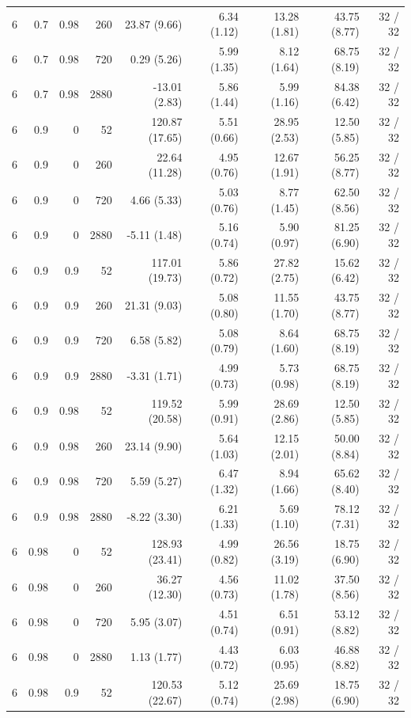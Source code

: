 \begin{longtable}{rrrrrrrrr}
6 & 0.7 & 0.98 & 260 & 23.87 (9.66) & 6.34 (1.12) & 13.28 (1.81) & 43.75 (8.77) & 32 / 32\\
6 & 0.7 & 0.98 & 720 & 0.29 (5.26) & 5.99 (1.35) & 8.12 (1.64) & 68.75 (8.19) & 32 / 32\\
6 & 0.7 & 0.98 & 2880 & -13.01 (2.83) & 5.86 (1.44) & 5.99 (1.16) & 84.38 (6.42) & 32 / 32\\
6 & 0.9 & 0 & 52 & 120.87 (17.65) & 5.51 (0.66) & 28.95 (2.53) & 12.50 (5.85) & 32 / 32\\
6 & 0.9 & 0 & 260 & 22.64 (11.28) & 4.95 (0.76) & 12.67 (1.91) & 56.25 (8.77) & 32 / 32\\
6 & 0.9 & 0 & 720 & 4.66 (5.33) & 5.03 (0.76) & 8.77 (1.45) & 62.50 (8.56) & 32 / 32\\
6 & 0.9 & 0 & 2880 & -5.11 (1.48) & 5.16 (0.74) & 5.90 (0.97) & 81.25 (6.90) & 32 / 32\\
6 & 0.9 & 0.9 & 52 & 117.01 (19.73) & 5.86 (0.72) & 27.82 (2.75) & 15.62 (6.42) & 32 / 32\\
6 & 0.9 & 0.9 & 260 & 21.31 (9.03) & 5.08 (0.80) & 11.55 (1.70) & 43.75 (8.77) & 32 / 32\\
6 & 0.9 & 0.9 & 720 & 6.58 (5.82) & 5.08 (0.79) & 8.64 (1.60) & 68.75 (8.19) & 32 / 32\\
6 & 0.9 & 0.9 & 2880 & -3.31 (1.71) & 4.99 (0.73) & 5.73 (0.98) & 68.75 (8.19) & 32 / 32\\
6 & 0.9 & 0.98 & 52 & 119.52 (20.58) & 5.99 (0.91) & 28.69 (2.86) & 12.50 (5.85) & 32 / 32\\
6 & 0.9 & 0.98 & 260 & 23.14 (9.90) & 5.64 (1.03) & 12.15 (2.01) & 50.00 (8.84) & 32 / 32\\
6 & 0.9 & 0.98 & 720 & 5.59 (5.27) & 6.47 (1.32) & 8.94 (1.66) & 65.62 (8.40) & 32 / 32\\
6 & 0.9 & 0.98 & 2880 & -8.22 (3.30) & 6.21 (1.33) & 5.69 (1.10) & 78.12 (7.31) & 32 / 32\\
6 & 0.98 & 0 & 52 & 128.93 (23.41) & 4.99 (0.82) & 26.56 (3.19) & 18.75 (6.90) & 32 / 32\\
6 & 0.98 & 0 & 260 & 36.27 (12.30) & 4.56 (0.73) & 11.02 (1.78) & 37.50 (8.56) & 32 / 32\\
6 & 0.98 & 0 & 720 & 5.95 (3.07) & 4.51 (0.74) & 6.51 (0.91) & 53.12 (8.82) & 32 / 32\\
6 & 0.98 & 0 & 2880 & 1.13 (1.77) & 4.43 (0.72) & 6.03 (0.95) & 46.88 (8.82) & 32 / 32\\
6 & 0.98 & 0.9 & 52 & 120.53 (22.67) & 5.12 (0.74) & 25.69 (2.98) & 18.75 (6.90) & 32 / 32\\

\end{longtable}
